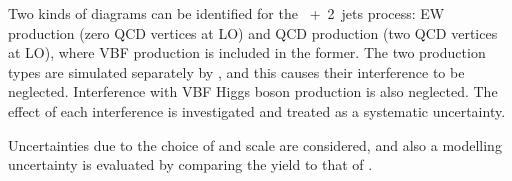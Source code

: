 Two kinds of diagrams can be identified for the \WW~+~2~jets process: EW production (zero QCD 
vertices at LO) and QCD production (two QCD vertices at LO), where VBF \WW production is 
included in the former. The two production types are simulated separately by \sherpa, and 
this causes their interference to be neglected. Interference with VBF Higgs boson production 
is also neglected. The effect of each interference is investigated and treated as a 
systematic uncertainty.

Uncertainties due to the choice of \mur and \muf scale are considered, and also a modelling 
uncertainty is evaluated by comparing the \sherpa yield to that of 
.

